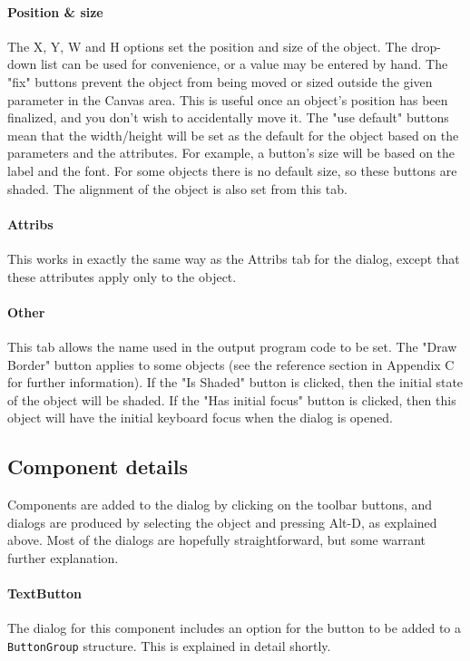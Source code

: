 \paragraph{Position \& size}
The X, Y, W and H options set the position and size of the object. The
drop-down list can be used for convenience, or a value may be entered
by hand. The "fix" buttons prevent the
object from being moved or sized outside the given parameter in the
Canvas area. This is useful once an object's position
has been finalized, and you don't wish to accidentally
move it. The "use default" buttons mean
that the width/height will be set as the default for the object based
on the parameters and the attributes. For example, a
button's size will be based on the label and the font.
For some objects there is no default size, so these buttons are shaded.
The alignment of the object is also set from this tab.

\paragraph{Attribs}
This works in exactly the same way as the Attribs tab for the dialog,
except that these attributes apply only to the object.

\paragraph{Other}
This tab allows the name used in the output program code to be set.
The "Draw
Border" button applies to some objects (see the reference
section in Appendix C for further information). If the
"Is Shaded" button is clicked, then the
initial state of the object will be shaded. If the "Has
initial focus" button is clicked, then this object will
have the initial keyboard focus when the dialog is
opened.

\subsection{Component details}

Components are added to the dialog by clicking on the toolbar buttons,
and dialogs are produced by selecting the object and pressing Alt-D, as
explained above. Most of the dialogs are hopefully straightforward, but
some warrant further explanation.

\paragraph{TextButton}
The dialog for this component includes an option for the button to be
added to a \texttt{ButtonGroup} structure. This is explained in detail
shortly.

